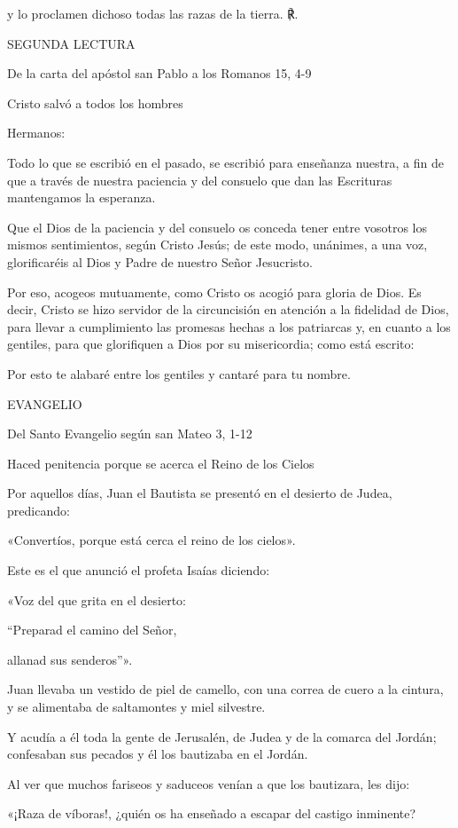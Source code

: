 \documentclass[]{article}
\begin{document}
y lo proclamen dichoso todas las razas de la tierra. ℟.

SEGUNDA LECTURA

De la carta del apóstol san Pablo a los Romanos 15, 4-9

Cristo salvó a todos los hombres

Hermanos:

Todo lo que se escribió en el pasado, se escribió para enseñanza
nuestra, a fin de que a través de nuestra paciencia y del consuelo que
dan las Escrituras mantengamos la esperanza.

Que el Dios de la paciencia y del consuelo os conceda tener entre
vosotros los mismos sentimientos, según Cristo Jesús; de este modo,
unánimes, a una voz, glorificaréis al Dios y Padre de nuestro Señor
Jesucristo.

Por eso, acogeos mutuamente, como Cristo os acogió para gloria de Dios.
Es decir, Cristo se hizo servidor de la circuncisión en atención a la
fidelidad de Dios, para llevar a cumplimiento las promesas hechas a los
patriarcas y, en cuanto a los gentiles, para que glorifiquen a Dios por
su misericordia; como está escrito:

Por esto te alabaré entre los gentiles y cantaré para tu nombre.

EVANGELIO

Del Santo Evangelio según san Mateo 3, 1-12

Haced penitencia porque se acerca el Reino de los Cielos

Por aquellos días, Juan el Bautista se presentó en el desierto de Judea,
predicando:

«Convertíos, porque está cerca el reino de los cielos».

Este es el que anunció el profeta Isaías diciendo:

«Voz del que grita en el desierto:

``Preparad el camino del Señor,

allanad sus senderos''».

Juan llevaba un vestido de piel de camello, con una correa de cuero a la
cintura, y se alimentaba de saltamontes y miel silvestre.

Y acudía a él toda la gente de Jerusalén, de Judea y de la comarca del
Jordán; confesaban sus pecados y él los bautizaba en el Jordán.

Al ver que muchos fariseos y saduceos venían a que los bautizara, les
dijo:

«¡Raza de víboras!, ¿quién os ha enseñado a escapar del castigo
inminente?
\end{document}
